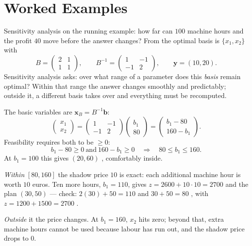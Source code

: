 \section{Worked Examples}

\begin{worked}{Sensitivity analysis on the running example: how far can $100$ machine hours and the profit $40$ move before the answer changes?}
From  the optimal basis is $\{x_{1},x_{2}\}$ with
\[
  B=\begin{pmatrix}2&1\\1&1\end{pmatrix},
  \qquad
  B^{-1}=\begin{pmatrix}1&-1\\-1&2\end{pmatrix},
  \qquad
  \mathbf y=(10,20) .
\]
Sensitivity analysis asks: over what range of a parameter does this
\emph{basis} remain optimal? Within that range the answer changes smoothly
and predictably; outside it, a different basis takes over and everything
must be recomputed.

The basic variables are $\mathbf x_{B}=B^{-1}\mathbf b$:
\[
  \begin{pmatrix}x_{1}\\x_{2}\end{pmatrix}
  =\begin{pmatrix}1&-1\\-1&2\end{pmatrix}\begin{pmatrix}b_{1}\\80\end{pmatrix}
  =\begin{pmatrix}b_{1}-80\\160-b_{1}\end{pmatrix}.
\]
Feasibility requires both to be $\ge0$:
\[
  b_{1}-80\ge0\ \text{and}\ 160-b_{1}\ge0
  \quad\Longrightarrow\quad
  \boxed{80\le b_{1}\le160 .}
\]
At $b_{1}=100$ this gives $(20,60)$ \checkmark, comfortably inside.

\emph{Within} $[80,160]$ the shadow price $10$ is exact: each additional
machine hour is worth $10$ euros. Ten more hours, $b_{1}=110$, gives
$z=2600+10\cdot10=2700$ and the plan $(30,50)$ --- check:
$2(30)+50=110$ \checkmark and $30+50=80$ \checkmark, with
$z=1200+1500=2700$ \checkmark.

\emph{Outside} it the price changes. At $b_{1}=160$, $x_{2}$ hits zero;
beyond that, extra machine hours cannot be used because labour has run out,
and the shadow price drops to $0$.


\end{worked}
